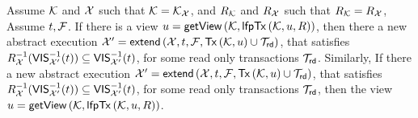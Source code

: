 \begin{theorem}
    \label{thm:view-vis-relation}
    Assume \( \mathcal{K} \) and \( \mathcal{X} \) such that \( \mathcal{K} = \mathcal{K}_{\mathcal{X}} \), 
    and \( R_{\mathcal{K}} \) and \( R_{\mathcal{X}} \) such that \( R_{\mathcal{K}} = R_{\mathcal{X}} \),
    Assume \(t, \mathcal{F} \).
    If there is a view \( \vi = \getView[\mkvs,\lfpTx[\mkvs,\vi,\rel]] \),
    then there a new abstract execution \( \aexec' = \extend[\aexec, \txid, \fp, \Tx[\mkvs, \vi] \cup \txidset_\rd] \),
    that satisfies \( R_{\mathcal{X}}^{-1}(\mathsf{VIS}_{\mathcal{X}'}^{-1}(t)) \subseteq \mathsf{VIS}_{\mathcal{X}'}^{-1}(t) \),
    for some read only transactions \( \mathcal{T}_{\mathsf{rd}} \).
    Similarly,
    If there a new abstract execution \( \aexec' = \extend[\aexec, \txid, \fp, \Tx[\mkvs, \vi] \cup \txidset_\rd] \),
    that satisfies \( R_{\mathcal{X}}^{-1}(\mathsf{VIS}_{\mathcal{X}'}^{-1}(t)) \subseteq \mathsf{VIS}_{\mathcal{X}'}^{-1}(t) \),
    for some read only transactions \( \mathcal{T}_{\mathsf{rd}} \),
    then the view \( \vi = \getView[\mkvs,\lfpTx[\mkvs,\vi,\rel]] \).
\end{theorem}

